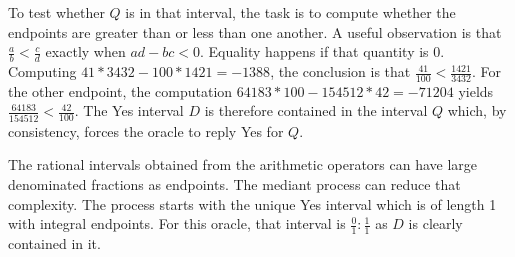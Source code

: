\documentclass[12pt]{article}
\begin{document}
To test whether $Q$ is in that interval, the task is to compute whether the endpoints are greater than or less than one another. A useful observation is that $\frac{a}{b} < \frac{c}{d}$ exactly when $ad - bc < 0$. Equality happens if that quantity is 0. Computing $41*3432 - 100*1421 = -1388$, the conclusion is that $\frac{41}{100} < \frac{1421}{3432}$. For the other endpoint, the computation $64183*100 - 154512*42 = -71204$ yields $ \frac{64183}{154512} < \frac{42}{100}$. The Yes interval $D$ is therefore contained in the interval $Q$ which, by consistency, forces the oracle to reply Yes for $Q$. 

The rational intervals obtained from the arithmetic operators can have large denominated fractions as endpoints. The mediant process can reduce that complexity. The process starts with the unique Yes interval which is of length 1 with integral endpoints. For this oracle, that interval is $\frac{0}{1}:\frac{1}{1}$ as $D$ is clearly contained in it. 
\end{document}
